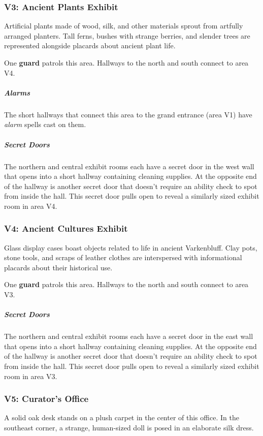 \documentclass[10pt,a4paper,twoside,bg=print,twocolumn,openany,nodeprecatedcode]{dndbook}
\begin{document}
\subsubsection{V3: Ancient Plants Exhibit}
\begin{DndReadAloud}{}
Artificial plants made of wood, silk, and other materials sprout from artfully arranged planters. Tall ferns, bushes with strange berries, and slender trees are represented alongside placards about ancient plant life.

\end{DndReadAloud}

One \textbf{guard} patrols this area. Hallways to the north and south connect to area V4.

\subparagraph{Alarms}
The short hallways that connect this area to the grand entrance (area V1) have \textit{alarm} spells cast on them.

\subparagraph{Secret Doors}
The northern and central exhibit rooms each have a secret door in the west wall that opens into a short hallway containing cleaning supplies. At the opposite end of the hallway is another secret door that doesn't require an ability check to spot from inside the hall. This secret door pulls open to reveal a similarly sized exhibit room in area V4.

\subsubsection{V4: Ancient Cultures Exhibit}
\begin{DndReadAloud}{}
Glass display cases boast objects related to life in ancient Varkenbluff. Clay pots, stone tools, and scraps of leather clothes are interspersed with informational placards about their historical use.

\end{DndReadAloud}

One \textbf{guard} patrols this area. Hallways to the north and south connect to area V3.

\subparagraph{Secret Doors}
The northern and central exhibit rooms each have a secret door in the east wall that opens into a short hallway containing cleaning supplies. At the opposite end of the hallway is another secret door that doesn't require an ability check to spot from inside the hall. This secret door pulls open to reveal a similarly sized exhibit room in area V3.

\subsubsection{V5: Curator's Office}
\begin{DndReadAloud}{}
A solid oak desk stands on a plush carpet in the center of this office. In the southeast corner, a strange, human-sized doll is posed in an elaborate silk dress.

\end{DndReadAloud}
\end{document}
